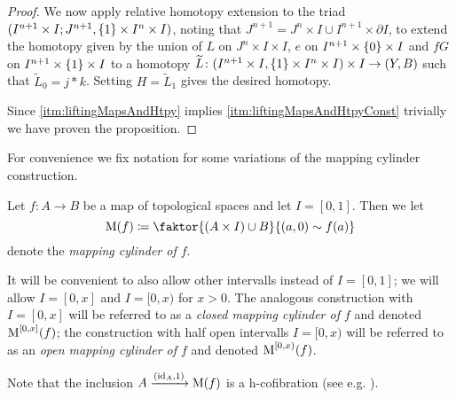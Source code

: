 \begin{prop}
\begin{proof}
        We now apply relative homotopy extension to the triad $(I^{n+1}\times I;J^{n+1},\left\lbrace1\right\rbrace\times I^n\times I)$, noting that $J^{n+1}=J^n\times I\cup I^{n+1}\times\partial I$, to extend the homotopy given by the union of $L$ on $J^n\times I\times I$, $e$ on $I^{n+1}\times\left\lbrace0\right\rbrace\times I$ and $fG$ on $I^{n+1}\times\left\lbrace1\right\rbrace\times I$ to a homotopy $\widetilde{L}\colon(I^{n+1}\times I,\left\lbrace1\right\rbrace\times I^n\times I)\times I\to(Y,B)$ such that $\widetilde{L}_0=j*k$.
        Setting $H=\widetilde{L}_1$ gives the desired homotopy.


        Since \ref{itm:liftingMapsAndHtpy} implies \ref{itm:liftingMapsAndHtpyConst} trivially we have proven the proposition.
    \end{proof}
\end{prop}
For convenience we fix notation for some variations of the mapping cylinder construction.
\begin{definition}
    Let $f\colon A\to B$ be a map of topological spaces and let $I=[0,1]$.
    Then we let
    \begin{equation*}
        \M(f)\coloneqq\faktor{\left(A\times I\right)\cup B}{(a,0)\sim f(a)}
    \end{equation*}
    denote the \emph{mapping cylinder of $f$}.

    It will be convenient to also allow other intervalls instead of $I=[0,1]$; we will allow $I=[0,x]$ and $I=[0,x)$ for $x>0$.
    The analogous construction with $I=[0,x]$ will be referred to as a \emph{closed mapping cylinder of $f$} and denoted $\operatorname{M}^{[0,x]}(f)$;
    the construction with half open intervalls $I=[0,x)$ will be referred to as an \emph{open mapping cylinder of $f$} and denoted $\operatorname{M}^{[0,x)}(f)$.
\end{definition}
\begin{remark}
    Note that the inclusion $A\xrightarrow{(\text{id}_A,1)}\operatorname{M}(f)$ is a h-cofibration (see e.g. \cite[Theorem 2]{note_on_cofibs_1}).
\end{remark}
